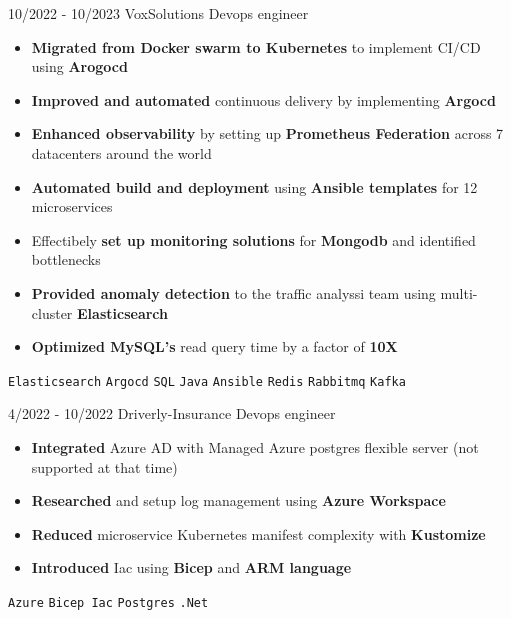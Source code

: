 \documentclass[9pt]{developercv} %
\begin{document}
\vspace{-5pt}
\begin{entrylist}
    \entry
    {10/2022 - 10/2023}
    {VoxSolutions}
    {Devops engineer}
    {\vspace{-6pt}
    \begin{itemize}[itemsep=2pt,topsep=0pt,parsep=0pt,partopsep=0pt, leftmargin=-1pt]
        \item{\textbf{Migrated from Docker swarm to Kubernetes} to implement CI/CD using \textbf{Arogocd}}
        \item{\textbf{Improved and automated} continuous delivery by implementing \textbf{Argocd} }
        \item{\textbf{Enhanced observability} by setting up \textbf{Prometheus Federation} across 7 datacenters around the world}
        \item{\textbf{Automated build and deployment} using \textbf{Ansible templates} for 12 microservices}
        \item{Effectibely \textbf{set up monitoring solutions} for \textbf{Mongodb} and identified bottlenecks}
        \item{\textbf{Provided anomaly detection} to the traffic analyssi team using multi-cluster \textbf{Elasticsearch}}
        \item{\textbf{Optimized MySQL's} read query time by a factor of \textbf{10X}}
    \end{itemize}
    {\vspace{2pt}}
    \texttt{Elasticsearch} \slashsep \texttt{Argocd} \slashsep \texttt{SQL} \slashsep \texttt{Java} \slashsep \texttt{Ansible} \slashsep \texttt{Redis} \slashsep \texttt{Rabbitmq} \slashsep \texttt{Kafka}}
\end{entrylist}
\begin{center}
    \hdashrule[0.2ex]{\linewidth}{0.5pt}{.8mm}
\end{center}
\vspace{5pt}
\begin{entrylist}
    \entry
    {4/2022 - 10/2022}
    {Driverly-Insurance}
    {Devops engineer}
    {\vspace{-6pt}
    \begin{itemize}[itemsep=2pt,topsep=0pt,parsep=0pt,partopsep=0pt, leftmargin=-1pt]
        \item{\textbf{Integrated} Azure AD with Managed Azure postgres flexible server (not supported at that time)}
        \item{\textbf{Researched} and setup log management using \textbf{Azure Workspace}}
        \item{\textbf{Reduced} microservice Kubernetes manifest complexity with \textbf{Kustomize}}
        \item{\textbf{Introduced} Iac using \textbf{Bicep} and \textbf{ARM language}}
    \end{itemize}
    {\vspace{2pt}}
    \texttt{Azure} \slashsep \texttt{Bicep Iac} \slashsep \texttt{Postgres} \slashsep \texttt{.Net}}
\end{entrylist}
\end{document}
